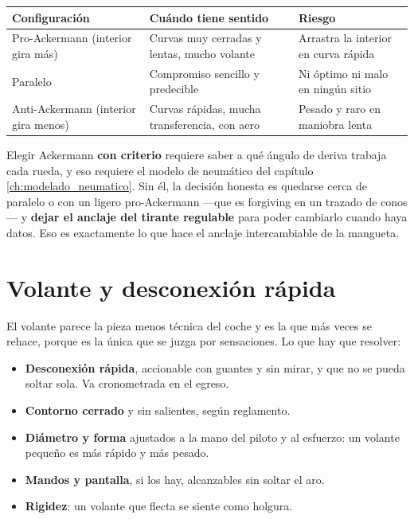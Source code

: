 \begin{center}
\begin{tabularx}{\textwidth}{@{}lXl@{}}
\toprule
\textbf{Configuración} & \textbf{Cuándo tiene sentido} & \textbf{Riesgo} \\
\midrule
Pro-Ackermann (interior gira más) & Curvas muy cerradas y lentas, mucho volante & Arrastra la interior en curva rápida \\
Paralelo & Compromiso sencillo y predecible & Ni óptimo ni malo en ningún sitio \\
Anti-Ackermann (interior gira menos) & Curvas rápidas, mucha transferencia, con aero & Pesado y raro en maniobra lenta \\
\bottomrule
\end{tabularx}
\end{center}

\begin{clave}
Elegir Ackermann \textbf{con criterio} requiere saber a qué ángulo de deriva
trabaja cada rueda, y eso requiere el modelo de neumático del capítulo
\ref{ch:modelado_neumatico}. Sin él, la decisión honesta es quedarse cerca de
paralelo o con un ligero pro-Ackermann ---que es forgiving en un trazado de
conos--- y \textbf{dejar el anclaje del tirante regulable} para poder cambiarlo
cuando haya datos. Eso es exactamente lo que hace el anclaje intercambiable de
la mangueta.
\end{clave}

\section{Volante y desconexión rápida}
\label{sec:direccion:05}

El volante parece la pieza menos técnica del coche y es la que más veces se
rehace, porque es la única que se juzga por sensaciones. Lo que hay que
resolver:

\begin{itemize}
  \item \textbf{Desconexión rápida}, accionable con guantes y sin mirar, y que
        no se pueda soltar sola. Va cronometrada en el egreso.
  \item \textbf{Contorno cerrado} y sin salientes, según reglamento.
  \item \textbf{Diámetro y forma} ajustados a la mano del piloto y al esfuerzo:
        un volante pequeño es más rápido y más pesado.
  \item \textbf{Mandos y pantalla}, si los hay, alcanzables sin soltar el aro.
  \item \textbf{Rigidez}: un volante que flecta se siente como holgura.
\end{itemize}

